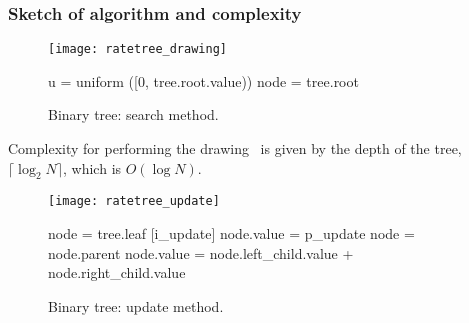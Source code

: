 \subsubsection {Sketch of algorithm and complexity} 
\begin{figure}[!h]
  \begin{minipage}{0.5\textwidth}
    \texttt{[image: ratetree\_drawing]}
  \end{minipage}
  \begin{minipage}{0.5\textwidth}
    \begin{algorithm}[H]
      \SetAlgoLined
      u = uniform ([0, tree.root.value))\;
        node = tree.root\;
              {
              }
    \end{algorithm}
  \end{minipage}
  \caption{Binary tree: search method.}
  \label{fig:tree_search}
\end{figure}

Complexity for performing the drawing~ is given by the depth of the tree, $\lceil\log_2 N\rceil$, which is $O(\log N)$.

\begin{figure}[!h]
  \begin{minipage}{0.5\textwidth}
    \texttt{[image: ratetree\_update]}
  \end{minipage}
  \begin{minipage}{0.5\textwidth}
    \begin{algorithm}[H]
      \SetAlgoLined
      node = tree.leaf [i\_update]\;
      node.value = p\_update\;
            {
              node = node.parent\;
              node.value = node.left\_child.value + node.right\_child.value\;
            }
    \end{algorithm}
  \end{minipage}
  \caption{Binary tree: update method.}
  \label{fig:tree_update}
\end{figure}

